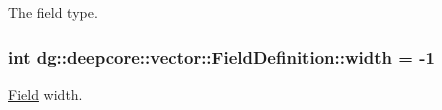 The field type. 

\subsubsection[{\texorpdfstring{width}{width}}]{\setlength{\rightskip}{0pt plus 5cm}int dg\+::deepcore\+::vector\+::\+Field\+Definition\+::width = -\/1}\hypertarget{structdg_1_1deepcore_1_1vector_1_1_field_definition_ae8230841926a1f3c2800397adad755d4}{}\label{structdg_1_1deepcore_1_1vector_1_1_field_definition_ae8230841926a1f3c2800397adad755d4}


\hyperlink{structdg_1_1deepcore_1_1vector_1_1_field}{Field} width. 

